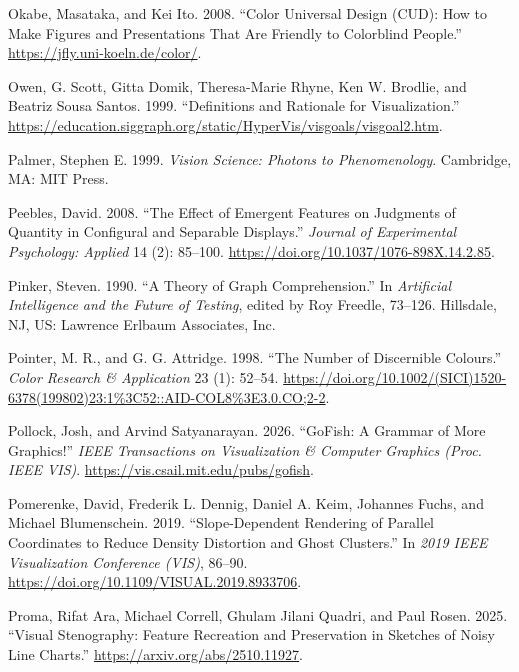 \documentclass[
  letterpaper,
  DIV=11,
  numbers=noendperiod]{scrreprt}
\newlength{\cslhangindent}
\newenvironment{CSLReferences}[2] %
 {\begin{list}{}{%
  \setlength{\itemindent}{0pt}
  \setlength{\leftmargin}{0pt}
  \setlength{\parsep}{0pt}
  \ifodd #1
   \setlength{\leftmargin}{\cslhangindent}
   \setlength{\itemindent}{-1\cslhangindent}
  \fi
  \setlength{\itemsep}{#2\baselineskip}}}
 {\end{list}}
\begin{document}
\begin{CSLReferences}{1}{0}
Okabe, Masataka, and Kei Ito. 2008. {``Color Universal Design ({CUD}):
How to Make Figures and Presentations That Are Friendly to Colorblind
People.''} \url{https://jfly.uni-koeln.de/color/}.

Owen, G. Scott, Gitta Domik, Theresa-Marie Rhyne, Ken W. Brodlie, and
Beatriz Sousa Santos. 1999. {``Definitions and Rationale for
Visualization.''}
\url{https://education.siggraph.org/static/HyperVis/visgoals/visgoal2.htm}.

Palmer, Stephen E. 1999. \emph{Vision Science: Photons to
Phenomenology}. Cambridge, MA: MIT Press.

Peebles, David. 2008. {``The Effect of Emergent Features on Judgments of
Quantity in Configural and Separable Displays.''} \emph{Journal of
Experimental Psychology: Applied} 14 (2): 85--100.
\url{https://doi.org/10.1037/1076-898X.14.2.85}.

Pinker, Steven. 1990. {``A Theory of Graph Comprehension.''} In
\emph{Artificial Intelligence and the Future of Testing}, edited by Roy
Freedle, 73--126. Hillsdale, NJ, US: Lawrence Erlbaum Associates, Inc.

Pointer, M. R., and G. G. Attridge. 1998. {``The Number of Discernible
Colours.''} \emph{Color Research \& Application} 23 (1): 52--54.
\url{https://doi.org/10.1002/(SICI)1520-6378(199802)23:1\%3C52::AID-COL8\%3E3.0.CO;2-2}.

Pollock, Josh, and Arvind Satyanarayan. 2026. {``{GoFish: A Grammar of
More Graphics!}''} \emph{IEEE Transactions on Visualization \& Computer
Graphics (Proc. IEEE VIS)}. \url{https://vis.csail.mit.edu/pubs/gofish}.

Pomerenke, David, Frederik L. Dennig, Daniel A. Keim, Johannes Fuchs,
and Michael Blumenschein. 2019. {``Slope-Dependent Rendering of Parallel
Coordinates to Reduce Density Distortion and Ghost Clusters.''} In
\emph{2019 IEEE Visualization Conference (VIS)}, 86--90.
\url{https://doi.org/10.1109/VISUAL.2019.8933706}.

Proma, Rifat Ara, Michael Correll, Ghulam Jilani Quadri, and Paul Rosen.
2025. {``Visual Stenography: Feature Recreation and Preservation in
Sketches of Noisy Line Charts.''}
\url{https://arxiv.org/abs/2510.11927}.


\end{CSLReferences}
\end{document}
